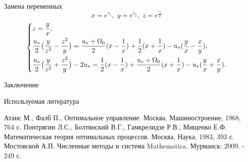 \documentclass[10pt]{beamer}
\begin{document}
\begin{frame}{Замена переменных}
	\[
		x=e^{\tau_1} ,\,\,y=e^{\tau_2} ,\,\,z=e^{\frac{\tau_f}{2}}
	\]
	\begin{equation}\label{findtau3}
		\left\{ {\begin{aligned}
					 & z=\frac{y}{x}, \hfill                                                                                                                                         \\
					 & \frac{u_*}{2}\big(\frac{y}{z^2}-\frac{z^2}{y}\big)=\frac{u_*+\Omega_0}{2}(x-\frac{1}{x})+\frac{1}{2}(x+\frac{1}{x})-u_*(\frac{y}{x}-\frac{x}{y}), \hfill      \\
					 & \frac{u_*}{2}\big(\frac{y}{z^2}+\frac{z^2}{y}\big)-2u_*=\frac{1}{2}(x-\frac{1}{x})+\frac{u_*+\Omega_0}{2}(x+\frac{1}{x})-u_*(\frac{y}{x}+\frac{x}{y}). \hfill \\
				\end{aligned}} \right.
	\end{equation}
\end{frame}



\begin{frame}{Заключение}


\end{frame}


\begin{frame}{Используемая литература}

	\begin{thebibliography}{3}
		 Атанс М., Фалб П., Оптимальное управление. Москва, Машиностроение, 1968, 764 с.
		 Понтрягин Л.С., Болтянский В.Г., Гамкрелидзе Р.В., Мищенко Е.Ф. Математическая теория оптимальных процессов. Москва, Наука, 1983, 393 с.\\
		 Мостовской А.П. Численные методы и система Mathematica. Мурманск: 2009. - 249 с.
	\end{thebibliography}

\end{frame}
\end{document}
